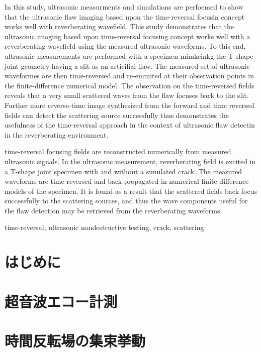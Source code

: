 \documentclass{jjsce}
\begin{document}
\begin{Eabstract}
In this study, ultrasonic measurments and simulations are perfoemed to show 
that the ultrasonic flaw imaging based upon the time-reversal focusin concept 
works well with reverberating wavefield.
 This study demonstrates that the ultrasonic imaging based upon time-reversal 
 focusing concept works well with a reverberating wavefield using the measured 
 ultrasonic waveforms. To this end, ultrasonic measurements are performed 
 with a specimen mimkcinkg the T-shape joint geometry having a slit as an articifial flaw. 
 The measured set of ultrasonic waveformes are then time-reversed and re-emmited at 
 their observation points in the finite-difference numerical model.
 The observation on the time-reversed fields reveals that a 
 very small scattered waves from the flaw focuses back to the slit. 
 Further more reverse-time image synthesized from the forward and 
 time reversed fields can detect the scattering source successfully thus 
 demonstrates the usefulness of the time-reversal approach in the context of 
 ultrasonic flaw detectin in the reverberating environment.

	time-reversal focusing fields are reconstructed numerically from measured ultrasonic signals. 
In the ultrasonic measurement, reverberating field is excited in a T-shape joint specimen with and without a simulated crack. 
The measured waveforms are time-reversed and back-propagated in numerical finite-difference models of the specimen. 
It is found as a result that the scattered fields back-focus successfully to the scattering sources, 
and thus the wave components useful for the flaw detection may be retrieved from the reverberating waveforms.
\end{Eabstract}
\begin{keyword}
time-reversal, ultrasonic nondestructive testing, crack, scattering
\end{keyword}
\maketitle

\section{はじめに}

\section{超音波エコー計測}

\section{時間反転場の集束挙動}

\end{document}
